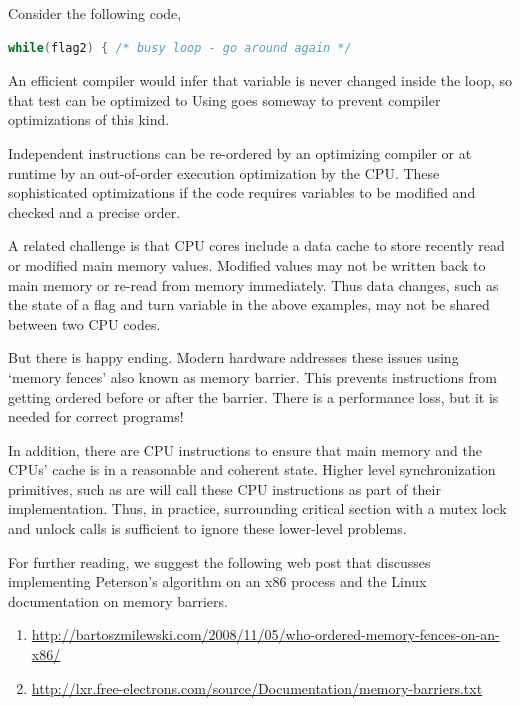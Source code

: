 Consider the following code,

\begin{lstlisting}[language=C]
while(flag2) { /* busy loop - go around again */
\end{lstlisting}

An efficient compiler would infer that  variable is never changed inside the loop, so that test can be optimized to  Using  goes someway to prevent compiler optimizations of this kind.

Independent instructions can be re-ordered by an optimizing compiler or at runtime by an out-of-order execution optimization by the CPU.
These sophisticated optimizations if the code requires variables to be modified and checked and a precise order.

A related challenge is that CPU cores include a data cache to store recently read or modified main memory values.
Modified values may not be written back to main memory or re-read from memory immediately.
Thus data changes, such as the state of a flag and turn variable in the above examples, may not be shared between two CPU codes.

But there is happy ending.
Modern hardware addresses these issues using `memory fences' also known as memory barrier.
This prevents instructions from getting ordered before or after the barrier.
There is a performance loss, but it is needed for correct programs!

In addition, there are CPU instructions to ensure that main memory and the CPUs' cache is in a reasonable and coherent state.
Higher level synchronization primitives, such as  are will call these CPU instructions as part of their implementation.
Thus, in practice, surrounding critical section with a mutex lock and unlock calls is sufficient to ignore these lower-level problems.

For further reading, we suggest the following web post that discusses implementing Peterson's algorithm on an x86 process and the Linux documentation on memory barriers.
\begin{enumerate}
\item \href{Memory Fences}{http://bartoszmilewski.com/2008/11/05/who-ordered-memory-fences-on-an-x86/}
\item \href{Memory Barriers}{http://lxr.free-electrons.com/source/Documentation/memory-barriers.txt}
\end{enumerate}



